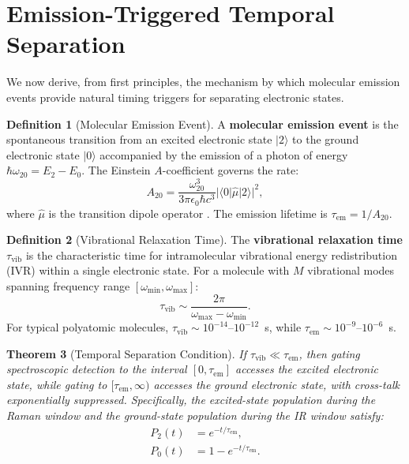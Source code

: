 \documentclass[11pt,twocolumn,a4paper]{article}
\newtheorem{theorem}{Theorem}[section]
\theoremstyle{definition}
\newtheorem{definition}[theorem]{Definition}
\theoremstyle{remark}
\begin{document}
\section{Emission-Triggered Temporal Separation}
\label{sec:emission}

We now derive, from first principles, the mechanism by which molecular emission events provide natural timing triggers for separating electronic states.

\begin{definition}[Molecular Emission Event]
\label{def:emission}
A \textbf{molecular emission event} is the spontaneous transition from an excited electronic state $|2\rangle$ to the ground electronic state $|0\rangle$ accompanied by the emission of a photon of energy $\hbar\omega_{20} = E_2 - E_0$. The Einstein $A$-coefficient governs the rate:
\begin{equation}
A_{20} = \frac{\omega_{20}^3}{3\pi \epsilon_0 \hbar c^3} |\langle 0 | \hat{\mu} | 2 \rangle|^2,
\end{equation}
where $\hat{\mu}$ is the transition dipole operator \citep{einstein1917, hilborn1982}. The emission lifetime is $\tau_{\mathrm{em}} = 1/A_{20}$.
\end{definition}

\begin{definition}[Vibrational Relaxation Time]
\label{def:tvib}
The \textbf{vibrational relaxation time} $\tau_{\mathrm{vib}}$ is the characteristic time for intramolecular vibrational energy redistribution (IVR) within a single electronic state. For a molecule with $M$ vibrational modes spanning frequency range $[\omega_{\min}, \omega_{\max}]$:
\begin{equation}
\tau_{\mathrm{vib}} \sim \frac{2\pi}{\omega_{\max} - \omega_{\min}}.
\end{equation}
For typical polyatomic molecules, $\tau_{\mathrm{vib}} \sim 10^{-14}$--$10^{-12}$~s, while $\tau_{\mathrm{em}} \sim 10^{-9}$--$10^{-6}$~s.
\end{definition}

\begin{theorem}[Temporal Separation Condition]
\label{thm:temporal_sep}
If $\tau_{\mathrm{vib}} \ll \tau_{\mathrm{em}}$, then gating spectroscopic detection to the interval $[0, \tau_{\mathrm{em}}]$ accesses the excited electronic state, while gating to $[\tau_{\mathrm{em}}, \infty)$ accesses the ground electronic state, with cross-talk exponentially suppressed. Specifically, the excited-state population during the Raman window and the ground-state population during the IR window satisfy:
\begin{align}
P_2(t) &= e^{-t/\tau_{\mathrm{em}}}, \label{eq:P2}\\
P_0(t) &= 1 - e^{-t/\tau_{\mathrm{em}}}. \label{eq:P0}
\end{align}
\end{theorem}
\end{document}
